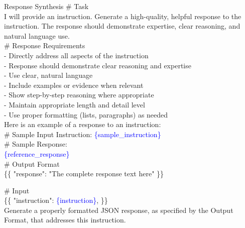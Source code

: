 \begin{promptbox}{Response Synthesis}
\# Task \\
I will provide an instruction. Generate a high-quality, helpful response to the instruction. The response should demonstrate expertise, clear reasoning, and natural language use. \\

\# Response Requirements \\
- Directly address all aspects of the instruction \\
- Response should demonstrate clear reasoning and expertise \\
- Use clear, natural language \\
- Include examples or evidence when relevant \\
- Show step-by-step reasoning where appropriate \\
- Maintain appropriate length and detail level \\
- Use proper formatting (lists, paragraphs) as needed \\

Here is an example of a response to an instruction: \\
\# Sample Input Instruction:
\textcolor{blue}{\{sample\_instruction\}} \\
\# Sample Response: \\
\textcolor{blue}{\{reference\_response\}} \\

\# Output Format \\
\{\{
  "response": "The complete response text here"
\}\}

\# Input \\
\{\{
  "instruction": \textcolor{blue}{\{instruction\}},
\}\} \\

Generate a properly formatted JSON response, as specified by the Output Format, that addresses this instruction.
\end{promptbox}

